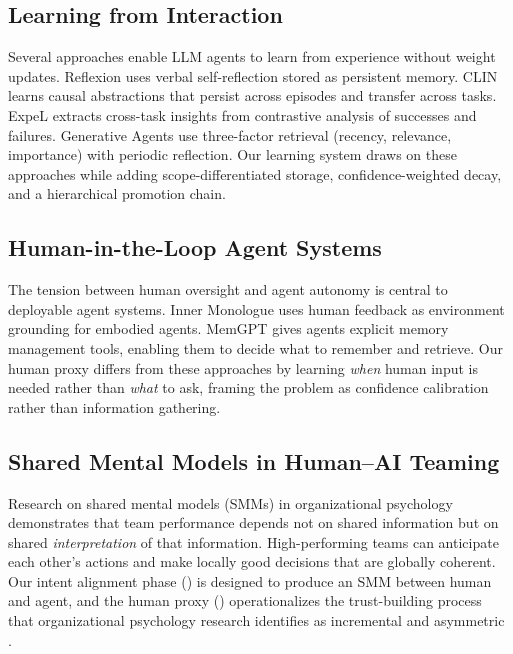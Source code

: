 \documentclass[11pt,a4paper]{article}
\begin{document}
\subsection{Learning from Interaction}

Several approaches enable LLM agents to learn from experience without
weight updates. Reflexion \citep{shinn2023reflexion} uses verbal
self-reflection stored as persistent memory.
CLIN \citep{majumder2024clin} learns causal abstractions that persist
across episodes and transfer across tasks.
ExpeL \citep{zhao2024expel} extracts cross-task insights from contrastive
analysis of successes and failures.
Generative Agents \citep{park2023generative} use three-factor retrieval
(recency, relevance, importance) with periodic reflection. Our learning
system draws on these approaches while adding scope-differentiated
storage, confidence-weighted decay, and a hierarchical promotion chain.

\subsection{Human-in-the-Loop Agent Systems}

The tension between human oversight and agent autonomy is central to
deployable agent systems. Inner Monologue \citep{huang2023inner} uses
human feedback as environment grounding for embodied agents.
MemGPT \citep{packer2023memgpt} gives agents explicit memory management
tools, enabling them to decide what to remember and retrieve. Our human
proxy differs from these approaches by learning \emph{when} human input
is needed rather than \emph{what} to ask, framing the problem as
confidence calibration rather than information gathering.

\subsection{Shared Mental Models in Human--AI Teaming}

Research on shared mental models (SMMs) in organizational psychology
\citep{cannon2001work} demonstrates that team performance depends not on
shared information but on shared \emph{interpretation} of that information.
High-performing teams can anticipate each other's actions and make locally
good decisions that are globally coherent. Our intent alignment phase
() is designed to produce an SMM between human and agent,
and the human proxy () operationalizes the trust-building
process that organizational psychology research identifies as incremental
and asymmetric \citep{edmondson1999psychological}.
\end{document}
